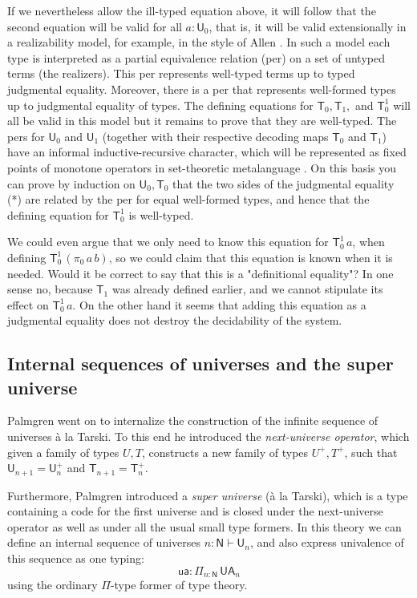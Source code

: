 \documentclass[11pt,a4paper]{article}
\def\NN{\mathsf{N}}
\def\UU{\mathsf{U}}
\newcommand{\N}{\mathsf{N}}
\newcommand{\T}{\mathsf{T}}
\newcommand{\ua}{\mathsf{ua}}
\newcommand{\UA}{\mathsf{UA}}
\begin{document}
If we nevertheless allow the ill-typed equation above, it will follow that the second equation will be valid for all $a : \UU_0$, that is, it will be valid extensionally in a realizability model, for example, in the style of Allen \cite{allen}. In such a model each type is interpreted as a partial equivalence relation (per) on a set of untyped terms (the realizers). This per represents well-typed terms up to typed judgmental equality. Moreover, there is a per that represents well-formed types up to judgmental equality of types. The defining equations for $\T_0, \T_1,$ and $\T_0^1$ will all be valid in this model but it remains to prove that they are well-typed. The pers for $\UU_0$ and $\UU_1$ (together with their respective decoding maps $\T_0$ and  $\T_1$) have an informal inductive-recursive character, which will be represented as fixed points of monotone operators in set-theoretic metalanguage \cite{allen}. On this basis you can prove by induction on $\UU_0, \T_0$ that the two sides of the judgmental equality (*) are related by the per for equal well-formed types, and hence that the defining equation for $\T_0^1$ is well-typed.

We could even argue that we only need to know this equation for $\T_0^1\, a$, when defining $\T_0^1\, (\pi_0\,a\, b)$, so we could claim that this equation is known when it is needed. Would it be correct to say that this is a "definitional equality"? In one sense no, because $\T_1$ was already defined earlier, and we cannot stipulate its effect on $\T_0^1\, a$. On the other hand it seems that adding this equation as a judgmental equality does not destroy the decidability of the system.

\subsection{Internal sequences of universes and the super universe}

Palmgren \cite{palmgren:venice} went on to internalize the construction of the infinite sequence of universes  \`a la Tarski. To this end he introduced the {\em next-universe operator}, which given a family of types $U, T$, constructs a new family of types $U^+, T^+$, such that $ \UU_{n+1} = \UU_n^+$ and $\T_{n+1} = \T_n^+$.

Furthermore, Palmgren introduced a {\em super universe} (\`a la Tarski), which is a type containing a code for the first universe and is closed under the next-universe operator as well as under all the usual small type formers. In this theory we can define an internal sequence of universes $n : \NN \vdash \UU_n$, and also express univalence of this sequence as one typing:
$$
\ua : \Pi_{n : \N}\, \UA_n
$$
using the ordinary $\Pi$-type former of type theory.
\end{document}
